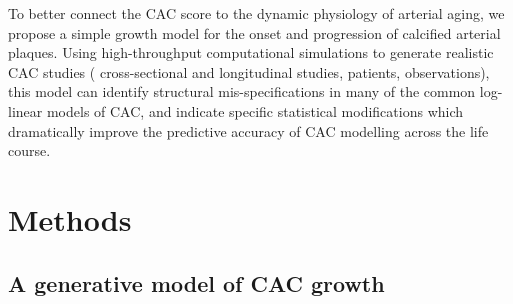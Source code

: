 \documentclass[aps,pre,twocolumn,twoside,tightenlines,groupedaddress,amsmath,amssymb,nobibnotes,final,showkeys,letterpaper]{revtex4-2}
\begin{document}
To better connect the CAC score to the dynamic physiology of arterial aging, we propose a simple growth model for the onset and progression of calcified arterial plaques. Using  high-throughput computational simulations to generate \numStudies{} realistic CAC studies (\numStudiesCross{} cross-sectional and \numStudiesLong{} longitudinal studies, \numPatients{} patients, \numObservations{} observations), this model can identify structural mis-specifications in many of the common log-linear models of CAC, and indicate specific statistical modifications which dramatically improve the predictive accuracy of CAC modelling across the life course.

\section{Methods}

\subsection*{A generative model of CAC growth}
\end{document}
